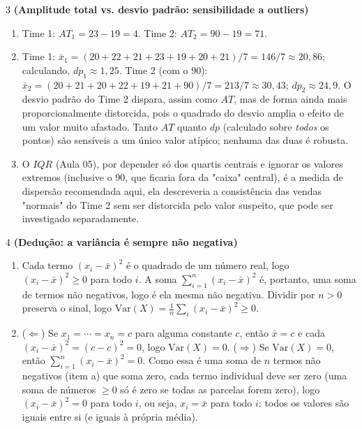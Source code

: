 \documentclass[11pt]{article}
\begin{document}
\begin{questao}{3} \textbf{(Amplitude total vs. desvio padrão: sensibilidade a outliers)}
\begin{solucao}
\begin{enumerate}[label=(\alph*)]
  \item Time 1: $AT_1 = 23-19=4$. Time 2: $AT_2 = 90-19=71$.
  \item Time 1: $\bar x_1 = (20+22+21+23+19+20+21)/7 = 146/7\approx 20{,}86$; calculando,
    $dp_1\approx 1{,}25$. Time 2 (com o 90): $\bar x_2 = (20+21+20+22+19+21+90)/7 = 213/7\approx
    30{,}43$; $dp_2\approx 24{,}9$. O desvio padrão do Time 2 dispara, assim como $AT$, mas de
    forma ainda mais proporcionalmente distorcida, pois o quadrado do desvio amplia o efeito de um
    valor muito afastado. Tanto $AT$ quanto $dp$ (calculado sobre \emph{todos} os pontos) são
    sensíveis a um único valor atípico; nenhuma das duas é robusta.
  \item O $IQR$ (Aula 05), por depender só dos quartis centrais e ignorar os valores extremos
    (inclusive o 90, que ficaria fora da "caixa" central), é a medida de dispersão recomendada
    aqui, ela descreveria a consistência das vendas "normais" do Time 2 sem ser distorcida pelo
    valor suspeito, que pode ser investigado separadamente.
\end{enumerate}
\end{solucao}
\end{questao}

\begin{questao}{4} \textbf{(Dedução: a variância é sempre não negativa)}
\begin{solucao}
\begin{enumerate}[label=(\alph*)]
  \item Cada termo $(x_i - \bar x)^2$ é o quadrado de um número real, logo $(x_i-\bar x)^2 \ge 0$
    para todo $i$. A soma $\sum_{i=1}^n (x_i-\bar x)^2$ é, portanto, uma soma de termos não
    negativos, logo é ela mesma não negativa. Dividir por $n>0$ preserva o sinal, logo
    $\mathrm{Var}(X) = \frac{1}{n}\sum_i (x_i-\bar x)^2 \ge 0$.
  \item ($\Leftarrow$) Se $x_1=\cdots=x_n=c$ para alguma constante $c$, então $\bar x = c$ e cada
    $(x_i-\bar x)^2 = (c-c)^2=0$, logo $\mathrm{Var}(X)=0$.
    ($\Rightarrow$) Se $\mathrm{Var}(X)=0$, então $\sum_{i=1}^n (x_i-\bar x)^2 = 0$. Como essa é
    uma soma de $n$ termos não negativos (item a) que soma zero, cada termo individual deve ser
    zero (uma soma de números $\ge 0$ só é zero se todas as parcelas forem zero), logo
    $(x_i-\bar x)^2=0$ para todo $i$, ou seja, $x_i=\bar x$ para todo $i$: todos os valores são
    iguais entre si (e iguais à própria média).
\end{enumerate}
\end{solucao}
\end{questao}
\end{document}
